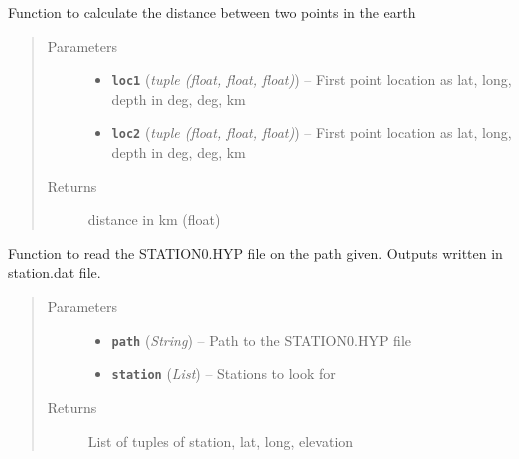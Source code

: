 \documentclass[a4paper,10pt,english]{sphinxmanual}
\begin{document}

\begin{fulllineitems}
\label{utils:catalogue2DD._separation}
Function to calculate the distance between two points in the earth
\begin{quote}\begin{description}
\item[{Parameters}] \leavevmode\begin{itemize}
\item {} 
\textbf{\texttt{loc1}} (\emph{tuple (float, float, float)}) -- First point location as lat, long, depth in deg, deg, km

\item {} 
\textbf{\texttt{loc2}} (\emph{tuple (float, float, float)}) -- First point location as lat, long, depth in deg, deg, km

\end{itemize}

\item[{Returns}] \leavevmode
distance in km (float)

\end{description}\end{quote}

\end{fulllineitems}


\begin{fulllineitems}
\label{utils:catalogue2DD.readSTATION0}
Function to read the STATION0.HYP file on the path given.  Outputs written
in station.dat file.
\begin{quote}\begin{description}
\item[{Parameters}] \leavevmode\begin{itemize}
\item {} 
\textbf{\texttt{path}} (\emph{String}) -- Path to the STATION0.HYP file

\item {} 
\textbf{\texttt{station}} (\emph{List}) -- Stations to look for

\end{itemize}

\item[{Returns}] \leavevmode
List of tuples of station, lat, long, elevation

\end{description}\end{quote}

\end{fulllineitems}
\end{document}
